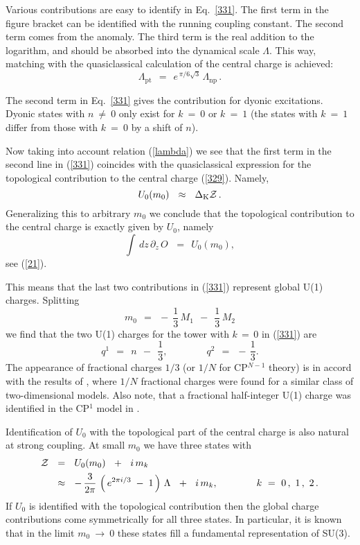 \documentclass[epsfig,12pt]{article}
\def\beq{\begin{equation}}
\def\eeq{\end{equation}}
\def\beq{\begin{equation}}
\def\eeq{\end{equation}}
\newcommand{\p}{\partial}
\newcommand{\mc}[1]{\mathcal{#1}}
\begin{document}
	Various contributions are easy to identify in Eq.~\eqref{331}.
	The first term in the figure bracket can be identified with the running coupling constant.
	The second term comes from the anomaly.
	The third term is the real addition to the logarithm, and should be absorbed into the dynamical scale $ \Lambda $.
	This way, matching with the quasiclassical calculation of the central charge is achieved:
\beq
	\Lambda_\text{pt} ~~=~~ e^{\, \pi / 6 \sqrt{3}}\, \Lambda_\text{np}\,.
\label{lambda}
\eeq

	The second term in Eq.~\eqref{331} gives the contribution for dyonic excitations.
	Dyonic states with $ n ~ \neq~ 0 $ only exist for $ k ~=~ 0 $ or $ k ~=~ 1 $
	(the states with $ k ~=~ 1 $ differ from those with $ k ~=~ 0 $ by a shift of $ n $).

	Now taking into account relation (\ref{lambda}) we see that  the first term in the second line in  (\ref{331})
	coincides with the quasiclassical expression for the topological contribution to the central charge (\ref{329}).
	Namely,
\beq
	U_0(m_0) ~~\approx~~ \Delta_{\rm K}{\mathcal Z}\,.
\label{UapproxT}
\eeq
	Generalizing this to arbitrary $ m_0 $ we conclude that the topological contribution to the central charge 
	is exactly given by $ U_0 $, namely
\beq
	\int\, dz\, \p_z\, O \, ~~=~~ U_0(m_0),
\label{U=T}
\eeq
	see (\ref{21}).

	This means that the last two contributions in (\ref{331}) represent global U(1) charges.
	Splitting
\beq
	m_0  ~~=~~  -~ \frac13\, M_1  ~~-~~ \frac13\, M_2
\eeq
	we find that the two U(1) charges for the tower with $ k \,=\, 0 $ in (\ref{331}) are
\beq
	q^1  ~~=~~  n  ~~-~~  \frac13, \qquad\qquad q^2 ~~=~~ -\,\frac13.
\label{qcharges}
\eeq
	The appearance of fractional charges $ 1/3 $ (or $ 1/N $ for CP$^{N-1}$ theory) is in accord with 
	the results of \cite{FeIn}, 
	where $ 1/N $ fractional charges were found for a similar class of two-dimensional models.
	Also note, that a fractional half-integer U(1) charge was identified in the CP$^1$ model in \cite{SVZw}.

	Identification of $ U_0 $ with the topological part of the central charge is also natural at strong coupling.
	At small $ m_0 $ we have three states with
\begin{align}
%
	\mc{Z} &  ~~=~~ U_0(m_0)  ~~+~~ i\, m_k 
	\\
%
\notag
	& 
	~~\approx~~   -\, \frac{3}{2\pi}\, \left(\, e^{2 \pi i / 3 } \;-\; 1 \,\right) \, \Lambda
	~~+~~  i\,m_k, 
	\qquad\qquad 
	k ~=~ 0\,,~1\,,~2\,.
\end{align}
	If $ U_0 $ is identified with the topological contribution then 
	the global charge contributions come symmetrically for all three states. 
	In particular, it is known that in the limit $ m_0 ~\to~ 0 $ these states fill a fundamental representation of SU(3).
\end{document}
